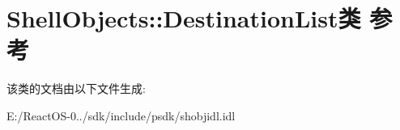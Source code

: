 \hypertarget{class_shell_objects_1_1_destination_list}{}\section{Shell\+Objects\+:\+:Destination\+List类 参考}
\label{class_shell_objects_1_1_destination_list}


该类的文档由以下文件生成\+:\begin{DoxyCompactItemize}
\item 
E\+:/\+React\+O\+S-\/0../sdk/include/psdk/shobjidl.\+idl\end{DoxyCompactItemize}
